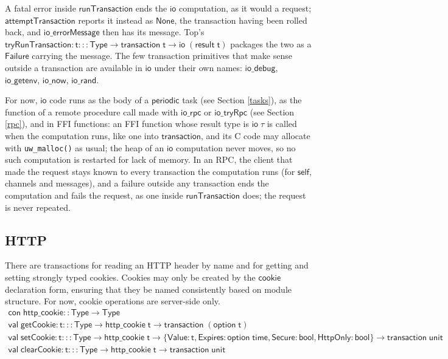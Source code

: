 \documentclass{article}
\newcommand{\mt}[1]{\mathsf{#1}}
\begin{document}
A fatal error inside $\mt{runTransaction}$ ends the $\mt{io}$ computation, as it would a request; $\mt{attemptTransaction}$ reports it instead as $\mt{None}$, the transaction having been rolled back, and $\mt{io\_errorMessage}$ then has its message.  Top's $\mt{tryRunTransaction} : \mt{t} ::: \mt{Type} \to \mt{transaction} \; \mt{t} \to \mt{io} \; (\mt{result} \; \mt{t})$ packages the two as a $\mt{Failure}$ carrying the message.  The few transaction primitives that make sense outside a transaction are available in $\mt{io}$ under their own names: $\mt{io\_debug}$, $\mt{io\_getenv}$, $\mt{io\_now}$, $\mt{io\_rand}$.

For now, $\mt{io}$ code runs as the body of a $\mt{periodic}$ task (see Section \ref{tasks}), as the function of a remote procedure call made with $\mt{io\_rpc}$ or $\mt{io\_tryRpc}$ (see Section \ref{rpc}), and in FFI functions: an FFI function whose result type is $\mt{io} \; \tau$ is called when the computation runs, like one into $\mt{transaction}$, and its C code may allocate with \texttt{uw\_malloc()} as usual; the heap of an $\mt{io}$ computation never moves, so no such computation is restarted for lack of memory.  In an RPC, the client that made the request stays known to every transaction the computation runs (for $\mt{self}$, channels and messages), and a failure outside any transaction ends the computation and fails the request, as one inside $\mt{runTransaction}$ does; the request is never repeated.

\subsection{HTTP}

There are transactions for reading an HTTP header by name and for getting and setting strongly typed cookies.  Cookies may only be created by the $\mt{cookie}$ declaration form, ensuring that they be named consistently based on module structure.  For now, cookie operations are server-side only.
$$\begin{array}{l}
  \mt{con} \; \mt{http\_cookie} :: \mt{Type} \to \mt{Type} \\
  \mt{val} \; \mt{getCookie} : \mt{t} ::: \mt{Type} \to \mt{http\_cookie} \; \mt{t} \to \mt{transaction} \; (\mt{option} \; \mt{t}) \\
  \mt{val} \; \mt{setCookie} : \mt{t} ::: \mt{Type} \to \mt{http\_cookie} \; \mt{t} \to \{\mt{Value} : \mt{t}, \mt{Expires} : \mt{option} \; \mt{time}, \mt{Secure} : \mt{bool}, \mt{HttpOnly} : \mt{bool}\} \to \mt{transaction} \; \mt{unit} \\
  \mt{val} \; \mt{clearCookie} : \mt{t} ::: \mt{Type} \to \mt{http\_cookie} \; \mt{t} \to \mt{transaction} \; \mt{unit}
\end{array}$$
\end{document}
